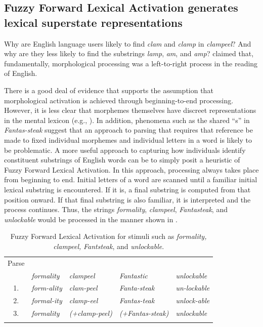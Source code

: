 \documentclass[output=paper]{langsci/langscibook}
\begin{document}
\subsection{Fuzzy Forward Lexical Activation generates lexical superstate representations}\label{sec:libben:1.4}

Why are English language users likely to find \textit{clam} and \textit{clamp} in \textit{clampeel}? And why are they less likely to find the substrings \textit{lamp}, \textit{am}, and \textit{amp}? \citet{TaftForster1976} claimed that, fundamentally, morphological processing was a left-to-right process in the reading of English.  

There is a good deal of evidence that supports the assumption that morphological activation is achieved through beginning-to-end processing. However, it is less clear that morphemes themselves have discreet representations in the mental lexicon (e.g., \citealt{BaayenSmolka2019,RamscarEtAl2018}).  In addition, phenomena such as the shared “s” in \textit{Fantas-steak} suggest that an approach to parsing that requires that reference be made to fixed individual morphemes and individual letters in a word is likely to be problematic.  A more useful approach to capturing how individuals identify constituent substrings of English words can be to simply posit a heuristic of Fuzzy Forward Lexical Activation. In this approach, processing always takes place from beginning to end. Initial letters of a word are scanned until a familiar initial lexical substring is encountered. If it is, a final substring is computed from that position onward. If that final substring is also familiar, it is interpreted and the process continues.  Thus, the strings \textit{formality}, \textit{clampeel}, \textit{Fantasteak}, and \textit{unlockable} would be processed in the manner shown in .

\begin{table}
\caption{\label{tab:libben:1}Fuzzy Forward Lexical Activation for stimuli such as \textit{formality,} \textit{clampeel,} \textit{Fantsteak}, and \textit{unlockable}.}
\begin{tabular}{c*{4}{>{\itshape}l}}
\lsptoprule

{Parse}  & \multicolumn{4}{c}{{Stimuli}}\\\cmidrule(lr){2-5}
& \textit{formality} & \textit{clampeel} & \textit{Fantastic} & \textit{unlockable}\\\midrule
 1. & form-ality & clam-peel & Fanta-steak & un-lockable\\
 2. & formal-ity & clamp-eel & Fantas-teak & unlock-able\\
 3. & formality & (+clamp-peel) & (+Fantas-steak) & unlockable\\
\lspbottomrule
\end{tabular}
\end{table}
\end{document}
